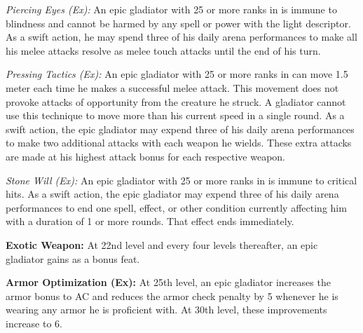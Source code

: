 \textit{Piercing Eyes (Ex):} An epic gladiator with 25 or more ranks in  is immune to blindness and cannot be harmed by any spell or power with the light descriptor. As a swift action, he may spend three of his daily arena performances to make all his melee attacks resolve as melee touch attacks until the end of his turn.

\textit{Pressing Tactics (Ex):} An epic gladiator with 25 or more ranks in  can move 1.5 meter each time he makes a successful melee attack. This movement does not provoke attacks of opportunity from the creature he struck. A gladiator cannot use this technique to move more than his current speed in a single round. As a swift action, the epic gladiator may expend three of his daily arena performances to make two additional attacks with each weapon he wields. These extra attacks are made at his highest attack bonus for each respective weapon.

\textit{Stone Will (Ex):} An epic gladiator with 25 or more ranks in  is immune to critical hits. As a swift action, the epic gladiator may expend three of his daily arena performances to end one spell, effect, or other condition currently affecting him with a duration of 1 or more rounds. That effect ends immediately.

\textbf{Exotic Weapon:} At 22nd level and every four levels thereafter, an epic gladiator gains  as a bonus feat.

\textbf{Armor Optimization (Ex):} At 25th level, an epic gladiator increases the armor bonus to AC and reduces the armor check penalty by 5 whenever he is wearing any armor he is proficient with. At 30th level, these improvements increase to 6.
